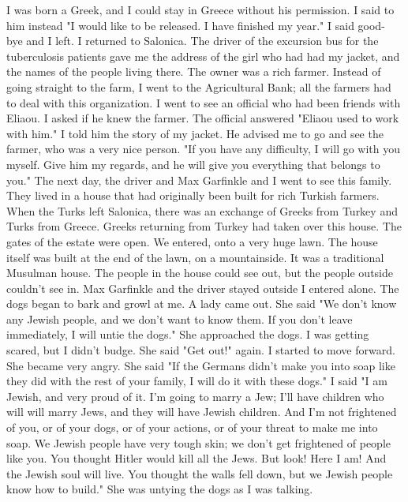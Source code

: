 
I was born a Greek, and I could stay in Greece without his permission.
I said 
to him instead "I would like to be released.
I have finished my year."
I said good-
bye and I left.
I returned to Salonica.
The driver of the excursion bus for the tuberculosis patients gave me 
the address of the girl who had had my jacket, and the names of the people living there.
The owner was a rich farmer.
Instead of going straight to the farm, I went to the Agricultural Bank; all the farmers had to deal with this organization.
I went to see an 
official who had been friends with Eliaou.
I asked if he knew the farmer.
The official 
answered "Eliaou used to work with him."
I told him the story of my jacket.
He advised 
me to go and see the farmer, who was a very nice person.
"If you have any difficulty, 
I will go with you myself.
Give him my regards, and he will give you everything that 
belongs to you."
The next day, the driver and Max Garfinkle and I went to see this family.
They 
lived in a house that had originally been built for rich Turkish farmers.
When the Turks 
left Salonica, there was an exchange of Greeks from Turkey and Turks from Greece.
Greeks 
returning from Turkey had taken over this house.
The gates of the estate were open.
We entered, onto a very huge lawn.
The house itself was built at the end of the lawn, on 
a mountainside.
It was a traditional Musulman house.
The people in the house could see 
out, but the people outside couldn't see in.
Max Garfinkle and the driver stayed outside 
I entered alone.
The dogs began to bark and growl at me.
A lady came out.
She said "We don't know any Jewish people, and we don't want to 
know them.
If you don't leave immediately, I will untie the dogs."
She approached the 
dogs.
I was getting scared, but I didn't budge.
She said 
"Get out!"
again.
I started 
to move forward.
She became very angry.
She said "If the Germans didn't make you into 
soap like they did with the rest of your family, I will do it with these dogs."
I said "I am Jewish, and very proud of it.
I'm going to marry a Jew; I'll have children who will 
will marry Jews, and they will have Jewish children.
And I'm not frightened of 
you, or of your dogs, or of your actions, or of your threat to make me into soap.
We 
Jewish people have very tough skin; we don't get frightened of people like you.
You 
thought Hitler would kill all the Jews.
But look!
Here I am!
And the Jewish soul will 
live.
You thought the walls fell down, but we Jewish people know how to build."
She 
was untying the dogs as I was talking.
